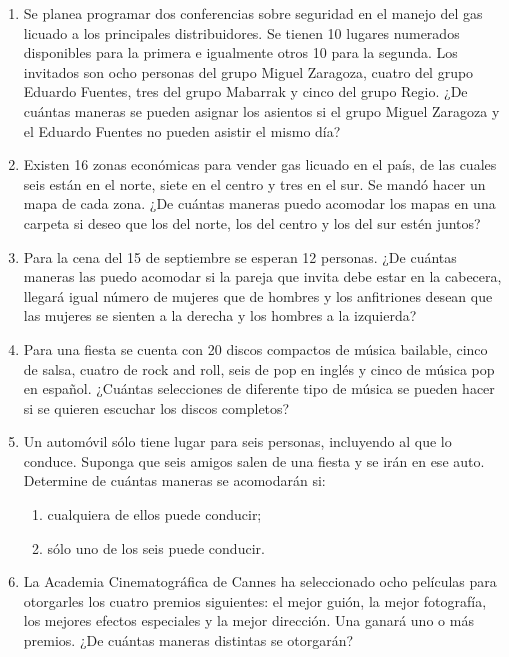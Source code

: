 \begin{Ejer}
\begin{enumerate}

\item Se planea programar dos conferencias sobre seguridad en el manejo del gas licuado a los principales distribuidores. Se tienen 10 lugares numerados disponibles para la primera e igualmente otros 10 para la segunda. Los invitados son ocho personas del grupo Miguel Zaragoza, cuatro del grupo Eduardo Fuentes, tres del grupo Mabarrak y cinco del grupo Regio. ¿De cu\'antas maneras se pueden asignar los asientos si el grupo Miguel Zaragoza y el Eduardo Fuentes no pueden asistir el mismo d\'ia?

\item Existen 16 zonas econ\'omicas para vender gas licuado en el pa\'is, de las cuales seis est\'an en el norte, siete en el centro y tres en el sur. Se mand\'o hacer un mapa de cada zona. ¿De cu\'antas maneras puedo acomodar los mapas en una carpeta si deseo que los del norte, los del centro y los del sur est\'en juntos?

\item Para la cena del 15 de septiembre se esperan 12 personas. ¿De cu\'antas maneras las puedo acomodar si la pareja que invita debe estar en la cabecera, llegar\'a igual n\'umero de mujeres que de hombres y los anfitriones desean que las mujeres se sienten a la derecha y los hombres a la izquierda?

\item Para una fiesta se cuenta con 20 discos compactos de m\'usica bailable, cinco de salsa, cuatro de rock and roll, seis de pop en ingl\'es y cinco de m\'usica pop en espa\~nol. ¿Cu\'antas selecciones de diferente tipo de m\'usica se pueden hacer si se quieren escuchar los discos completos?

\item Un autom\'ovil s\'olo tiene lugar para seis personas, incluyendo al que lo conduce. Suponga que seis amigos salen de una fiesta y se ir\'an en ese auto. Determine de cu\'antas maneras se acomodar\'an si:
\begin{enumerate}
\item cualquiera de ellos puede conducir;
\item s\'olo uno de los seis puede conducir.
\end{enumerate}

\item La Academia Cinematogr\'afica de Cannes ha seleccionado ocho pel\'iculas para otorgarles los cuatro premios siguientes: el mejor gui\'on, la mejor fotograf\'ia, los mejores efectos especiales y la mejor direcci\'on. Una ganar\'a uno o m\'as premios. ¿De cu\'antas maneras distintas se otorgar\'an?


\end{enumerate}
\end{Ejer}
